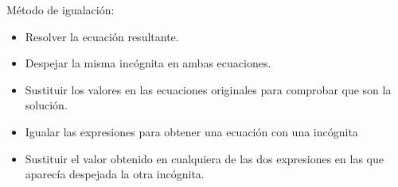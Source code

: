 \documentclass[12pt,addpoints]{evalua}
\begin{document}
\begin{questions}
{\begin{choices}
                  \choice M\'etodo de igualaci\'on:
                  \begin{itemize}
                        \item[\rule{1cm}{0.2mm}] Resolver la ecuaci\'on resultante.
                        \item[\rule{1cm}{0.2mm}] Despejar la misma inc\'ognita en ambas ecuaciones.
                        \item[\rule{1cm}{0.2mm}] Sustituir los valores en las ecuaciones originales para comprobar que son la soluci\'on.
                        \item[\rule{1cm}{0.2mm}] Igualar las expresiones para obtener una ecuaci\'on con una inc\'ognita
                        \item[\rule{1cm}{0.2mm}] Sustituir el valor obtenido en cualquiera de las dos expresiones en las que aparec\'ia despejada la otra inc\'ognita.
                  \end{itemize}
            \end{choices}
      }

\end{questions}
\end{document}

